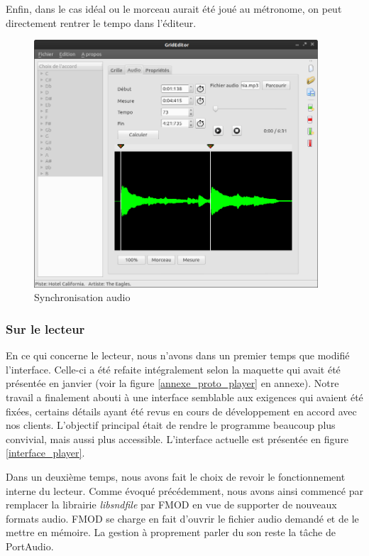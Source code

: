 Enfin, dans le cas idéal ou le morceau aurait été joué au métronome, on peut directement rentrer le tempo dans l'éditeur.
\begin{figure}[H]
\begin{center}
\includegraphics[width=400px]{editor_audiosync}
\caption{Synchronisation audio}
\label{editor_audiosync}
\end{center}
\end{figure}

\subsubsection{Sur le lecteur}

En ce qui concerne le lecteur, nous n'avons dans un premier temps que modifié l'interface. Celle-ci a été refaite intégralement selon la maquette qui avait été présentée en janvier (voir la figure \ref{annexe_proto_player} en annexe). Notre travail a finalement abouti à une interface semblable aux exigences qui avaient été fixées, certains détails ayant été revus en cours de développement en accord avec nos clients. L'objectif principal était de rendre le programme beaucoup plus convivial, mais aussi plus accessible. L'interface actuelle est présentée en figure \ref{interface_player}.

Dans un deuxième temps, nous avons fait le choix de revoir le fonctionnement interne du lecteur. Comme évoqué précédemment, nous avons ainsi commencé par remplacer la librairie \textit{libsndfile} par FMOD en vue de supporter de nouveaux formats audio. FMOD se charge en fait d'ouvrir le fichier audio demandé et de le mettre en mémoire. La gestion à proprement parler du son reste la tâche de PortAudio.

